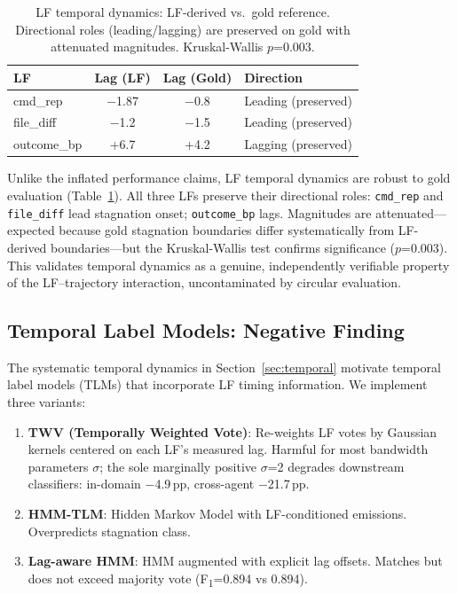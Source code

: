\documentclass[11pt,a4paper]{article}
\newcommand{\fone}{F\textsubscript{1}}
\newcommand{\pp}{\,pp}
\begin{document}
\begin{table}[t]
\centering
\small
\begin{tabular}{lccl}
\toprule
\textbf{LF} & \textbf{Lag (LF)} & \textbf{Lag (Gold)} & \textbf{Direction} \\
\midrule
cmd\_rep & $-$1.87 & $-$0.8 & Leading (preserved) \\
file\_diff & $-$1.2 & $-$1.5 & Leading (preserved) \\
outcome\_bp & +6.7 & +4.2 & Lagging (preserved) \\
\bottomrule
\end{tabular}
\caption{LF temporal dynamics: LF-derived vs.\ gold reference. Directional roles (leading/lagging) are preserved on gold with attenuated magnitudes. Kruskal-Wallis $p$=0.003.}
\label{tab:temporal}
\end{table}

Unlike the inflated performance claims, LF temporal dynamics are robust to gold evaluation (Table~\ref{tab:temporal}).
All three LFs preserve their directional roles: \texttt{cmd\_rep} and \texttt{file\_diff} lead stagnation onset; \texttt{outcome\_bp} lags.
Magnitudes are attenuated---expected because gold stagnation boundaries differ systematically from LF-derived boundaries---but the Kruskal-Wallis test confirms significance ($p$=0.003).
This validates temporal dynamics as a genuine, independently verifiable property of the LF--trajectory interaction, uncontaminated by circular evaluation.

\subsection{Temporal Label Models: Negative Finding}
\label{sec:tlm}

The systematic temporal dynamics in Section~\ref{sec:temporal} motivate temporal label models (TLMs) that incorporate LF timing information.
We implement three variants:

\begin{enumerate}
\item \textbf{TWV (Temporally Weighted Vote)}: Re-weights LF votes by Gaussian kernels centered on each LF's measured lag. Harmful for most bandwidth parameters $\sigma$; the sole marginally positive $\sigma$=2 degrades downstream classifiers: in-domain $-$4.9\pp, cross-agent $-$21.7\pp.
\item \textbf{HMM-TLM}: Hidden Markov Model with LF-conditioned emissions. Overpredicts stagnation class.
\item \textbf{Lag-aware HMM}: HMM augmented with explicit lag offsets. Matches but does not exceed majority vote (\fone{}=0.894 vs 0.894).
\end{enumerate}
\end{document}
